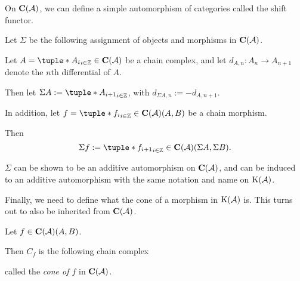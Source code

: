 On \( \C(\Ac) \), we can define a simple automorphism of categories called the shift functor.

\begin{definition}
    \label{def:chain_complex_shift}
    Let \( \Sigma \) be the following assignment of objects and morphisms in \( \C(\Ac) \).

    Let \( A = \tuple*{A_i}_{i \in \Zb} \in \C(\Ac) \) be a chain complex, and let \( d_{A, n}: A_n \to A_{n + 1} \) denote the \( n \)th differential of \( A \).

    Then let \( \Sigma A := \tuple*{A_{i + 1}}_{i \in \Zb} \), with \( d_{\Sigma A, n} := -d_{A, n + 1} \).

    In addition, let \( f = \tuple*{f_i}_{i \in \Zb} \in \C(\Ac)(A, B) \) be a chain morphism.
    
    Then
    \[
        \Sigma f := \tuple*{f_{i + 1}}_{i \in \Zb} \in \C(\Ac)(\Sigma A, \Sigma B).
    \]
\end{definition}

\( \Sigma \) can be shown to be an additive automorphism on \( \C(\Ac) \), and can be induced to an additive automorphism with the same notation and name on \( \operatorname{K}({\mathcal{A}}) \).

Finally, we need to define what the cone of a morphism in \( \operatorname{K}({\mathcal{A}}) \) is. This turns out to also be inherited from \( \C(\Ac) \).

\begin{definition}[Cone in \( \C(\Ac) \)]
    Let \( f \in \operatorname{\mathbf{C}}({\mathcal{A}})(A, B) \).

    Then \( C_f \) is the following chain complex
    \begin{center}
    \end{center}
    called the \emph{cone of \( f \)} in \( \C(\Ac) \).
\end{definition}

